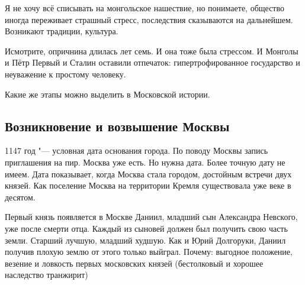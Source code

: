 Я не хочу всё списывать на монгольское нашествие, но понимаете, общество иногда переживает страшный стресс, последствия сказываются на дальнейшем. Возникают традиции, культура.

Исмотрите, опричнина длилась лет семь. И она тоже была стрессом. И Монголы и Пётр Первый и Сталин оставили отпечаток: гипертрофированное государство и неуважение к простому человеку.

Какие же этапы можно выделить в Московской истории.
\subsection{Возникновение и возвышение Москвы}
1147 год "--- условная дата основания города. По поводу Москвы запись приглашения на пир. Москва уже есть. Но нужна дата. Более точную дату не имеем. Дата показывает, когда Москва стала городом, достойным встречи двух князей. Как поселение Москва на территории Кремля существовала уже веке в десятом.

Первый князь появляется в Москве Даниил, младший сын Александра Невского, уже после смерти отца. Каждый из сыновей должен был получить свою часть земли. Старший лучшую, младший худшую. Как и Юрий Долгоруки, Даниил получив плохую землю от этого только выйграл. Почему:
выгодное положение, везение и ловкость первых московских князей (бестолковый и хорошее наследство транжирит)
